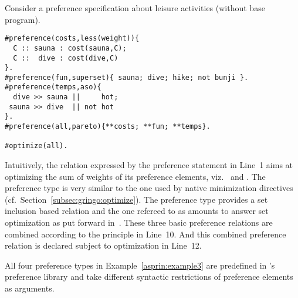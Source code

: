 \begin{example}\label{asprin:example3}
Consider a preference specification about leisure activities (without base program).
\begin{lstlisting}[escapechar=?]
#preference(costs,less(weight)){ 
  C :: sauna : cost(sauna,C); 
  C ::  dive : cost(dive,C) 
}.
#preference(fun,superset){ sauna; dive; hike; not bunji }.
#preference(temps,aso){
  dive >> sauna ||     hot; 
 sauna >> dive  || not hot
}.
#preference(all,pareto){**costs; **fun; **temps}.

#optimize(all).
\end{lstlisting}
Intuitively, the relation expressed by the preference statement  in Line~1 aims at optimizing the sum of weights of its preference elements, 
viz.\  and .
The preference type  is very similar to the one used by native minimization directives (cf.\ Section~\ref{subsec:gringo:optimize}).
The preference type  provides a set inclusion based relation and the one refereed to as 
amounts to answer set optimization as put forward in~\cite{brnitr03a}.
These three basic preference relations are combined according to the  principle in Line~10.
And this combined preference relation is declared subject to optimization in Line~12.
\end{example}
%
\begin{note}
All four preference types in Example~\ref{asprin:example3} are predefined in \asprin's preference library and take different syntactic restrictions of preference elements as arguments.  
\end{note}


